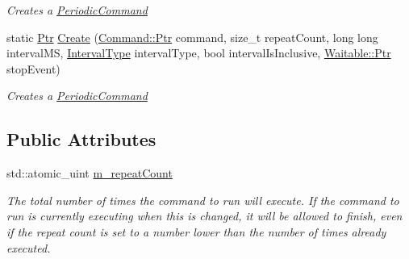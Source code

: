 \begin{DoxyCompactItemize}
\begin{DoxyCompactList}\small\item\em Creates a \mbox{\hyperlink{class_command_lib_1_1_periodic_command}{Periodic\+Command}} \end{DoxyCompactList}\item 
static \mbox{\hyperlink{class_command_lib_1_1_command_a3b3e4f00144373299df5c6bb1acc319d}{Ptr}} \mbox{\hyperlink{class_command_lib_1_1_periodic_command_aeaa8112e6cab67aa63eb906bea96e5d2}{Create}} (\mbox{\hyperlink{class_command_lib_1_1_command_a3b3e4f00144373299df5c6bb1acc319d}{Command\+::\+Ptr}} command, size\+\_\+t repeat\+Count, long long interval\+MS, \mbox{\hyperlink{class_command_lib_1_1_periodic_command_ac32ef93cf679cd652da30a0ad373d31e}{Interval\+Type}} interval\+Type, bool interval\+Is\+Inclusive, \mbox{\hyperlink{class_command_lib_1_1_waitable_ac74b6b91e48220146eada76a31cf2d9b}{Waitable\+::\+Ptr}} stop\+Event)
\begin{DoxyCompactList}\small\item\em Creates a \mbox{\hyperlink{class_command_lib_1_1_periodic_command}{Periodic\+Command}} \end{DoxyCompactList}\end{DoxyCompactItemize}
\subsection*{Public Attributes}
\begin{DoxyCompactItemize}
\item 
std\+::atomic\+\_\+uint \mbox{\hyperlink{class_command_lib_1_1_periodic_command_ab6e63dc1cc0fa2dc39eded7ca5f1fd94}{m\+\_\+repeat\+Count}}
\begin{DoxyCompactList}\small\item\em The total number of times the command to run will execute. If the command to run is currently executing when this is changed, it will be allowed to finish, even if the repeat count is set to a number lower than the number of times already executed. \end{DoxyCompactList}\end{DoxyCompactItemize}
